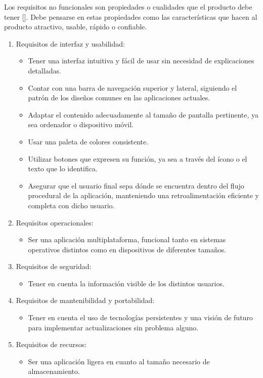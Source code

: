Los requisitos no funcionales son propiedades o cualidades que el producto debe tener [\cite{91}]. Debe pensarse en estas propiedades como las características que hacen al producto atractivo, usable, rápido o confiable.

\begin{enumerate}
\item Requisitos de interfaz y usabilidad:
	\begin{itemize}
	\item Tener una interfaz intuitiva y fácil de usar sin necesidad de explicaciones detalladas.
	\item Contar con una barra de navegación superior y lateral, siguiendo el patrón de los diseños comunes en las aplicaciones actuales.
	\item Adaptar el contenido adecuadamente al tamaño de pantalla pertinente, ya sea ordenador o dispositivo móvil.
	\item Usar una paleta de colores consistente.
	\item Utilizar botones que expresen su función, ya sea a través del ícono o el texto que lo identifica.
	\item Asegurar que el usuario final sepa dónde se encuentra dentro del flujo procedural de la aplicación, manteniendo una retroalimentación eficiente y completa con dicho usuario.
	\end{itemize}
\item Requisitos operacionales:
	\begin{itemize}
	\item Ser una aplicación multiplataforma, funcional tanto en sistemas operativos distintos como en dispositivos de diferentes tamaños.
	\end{itemize}
\item Requisitos de seguridad:
	\begin{itemize}
	\item Tener en cuenta la información visible de los distintos usuarios.
	\end{itemize}
\item Requisitos de mantenibilidad y portabilidad:
	\begin{itemize}
	\item Tener en cuenta el uso de tecnologías persistentes y una visión de futuro para implementar actualizaciones sin problema alguno.
	\end{itemize}
\item Requisitos de recursos:
	\begin{itemize}
	\item Ser una aplicación ligera en cuanto al tamaño necesario de almacenamiento.

\end{itemize}
\end{enumerate}
